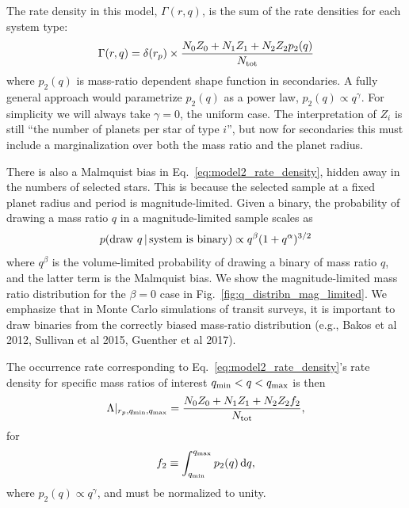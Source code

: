 The rate density in this model, $\Gamma(r,q)$, is the sum of the rate 
densities for each system type:
\begin{equation}
\Gamma(r,q)
=
\delta(r_p) \times 
\frac{N_0 Z_0 + N_1 Z_1 + N_2 Z_2 p_2(q)}{N_{\rm tot}}
\label{eq:model2_rate_density}
\end{equation}
where $p_2(q)$ is mass-ratio dependent shape function in secondaries. A fully 
general approach would parametrize $p_2(q)$ as a power law, $p_2(q) \propto 
q^\gamma$. For simplicity we will always take $\gamma=0$, the uniform case.
The interpretation of $Z_i$ is still ``the number of planets per star of 
type $i$'', but now for secondaries this must include a marginalization 
over both the mass ratio and the planet radius.

There is also a Malmquist bias in Eq.~\ref{eq:model2_rate_density}, hidden 
away in the numbers of selected stars.
This is because the selected sample at a fixed planet radius and period is 
magnitude-limited.
Given a binary, the probability of drawing a mass ratio $q$ in a 
magnitude-limited sample scales as
\begin{equation}
p({\rm draw\ }q\,|\,{\rm system\ is\ binary}) \propto q^\beta 
(1+q^\alpha)^{3/2}
\label{eq:Malmquist_bias}
\end{equation}
where $q^\beta$ is the volume-limited probability of drawing a binary of mass 
ratio $q$, and the latter term is the Malmquist bias.
We show the magnitude-limited mass ratio distribution for the $\beta=0$ case 
in Fig.~\ref{fig:q_distribn_mag_limited}.
We emphasize that in Monte Carlo simulations of transit surveys, it is 
important to draw binaries from the correctly biased mass-ratio distribution 
(e.g., Bakos et al 2012, Sullivan et al 2015, Guenther et al 2017).

The occurrence rate corresponding to Eq.~\ref{eq:model2_rate_density}'s rate 
density for specific mass ratios of interest $q_{\rm min} < q < q_{\rm 
max}$ is then
\begin{equation}
\Lambda|_{r_p,q_{\rm min},q_{\rm max}} = 
\frac{N_0 Z_0 + N_1 Z_1 + N_2 Z_2 f_2}
{N_{\rm tot}},
\end{equation}
for
\begin{equation}
f_2 \equiv
\int_{q_{\rm min}}^{q_{\rm max}} p_2(q) \,{\rm d}q,
\end{equation}
where $p_2(q)\propto q^\gamma$, and must be normalized to unity.


